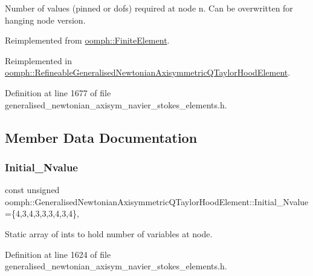 Number of values (pinned or dofs) required at node n. Can be overwritten for hanging node version. 



Reimplemented from \hyperlink{classoomph_1_1FiniteElement_a56610c60d5bc2d7c27407a1455471b1a}{oomph\+::\+Finite\+Element}.



Reimplemented in \hyperlink{classoomph_1_1RefineableGeneralisedNewtonianAxisymmetricQTaylorHoodElement_a02c6caa8509c6d227ef9ca4e3a53d5ea}{oomph\+::\+Refineable\+Generalised\+Newtonian\+Axisymmetric\+Q\+Taylor\+Hood\+Element}.



Definition at line 1677 of file generalised\+\_\+newtonian\+\_\+axisym\+\_\+navier\+\_\+stokes\+\_\+elements.\+h.



\subsection{Member Data Documentation}
\mbox{\label{classoomph_1_1GeneralisedNewtonianAxisymmetricQTaylorHoodElement_a7fa9ab4452c8892c51652f71142736f6}} 
\subsubsection{\texorpdfstring{Initial\+\_\+\+Nvalue}{Initial\_Nvalue}}
{\footnotesize\ttfamily const unsigned oomph\+::\+Generalised\+Newtonian\+Axisymmetric\+Q\+Taylor\+Hood\+Element\+::\+Initial\+\_\+\+Nvalue =\{4,3,4,3,3,3,4,3,4\}\hspace{0.3cm}{\ttfamily [static]}, {\ttfamily [private]}}



Static array of ints to hold number of variables at node. 



Definition at line 1624 of file generalised\+\_\+newtonian\+\_\+axisym\+\_\+navier\+\_\+stokes\+\_\+elements.\+h.



